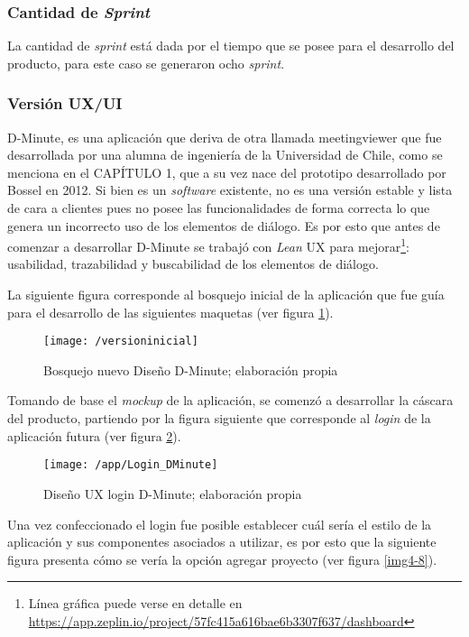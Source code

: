 \subsubsection{Cantidad de \textit{Sprint}}

La cantidad de \textit{sprint} está dada por el tiempo que se posee para el desarrollo del producto, para este caso se generaron ocho \textit{sprint}.

\subsubsection{Versión UX/UI}

D-Minute, es una aplicación que deriva de otra llamada meetingviewer que fue desarrollada por una alumna de ingeniería de la Universidad de Chile, como se menciona en el CAPÍTULO 1, que a su vez nace del prototipo desarrollado por Bossel en 2012. Si bien es un \textit{software} existente, no es una versión estable y lista de cara a clientes pues no posee las funcionalidades de forma correcta lo que genera un incorrecto uso de los elementos de diálogo. Es por esto que antes de comenzar a desarrollar D-Minute se trabajó con \textit{Lean} UX para mejorar\footnote{Línea gráfica puede verse en detalle en \url{https://app.zeplin.io/project/57fc415a616bae6b3307f637/dashboard}}: usabilidad, trazabilidad y buscabilidad de los elementos de diálogo.

La siguiente figura corresponde al bosquejo inicial de la aplicación que fue guía para el desarrollo de las siguientes maquetas (ver figura \ref{img4-6}).

\begin{figure}[!h]
\centering
\texttt{[image: /versioninicial]}
\caption{Bosquejo nuevo Diseño D-Minute; elaboración propia} 
\label{img4-6}
\end{figure}

Tomando de base el \textit{mockup} de la aplicación, se comenzó a desarrollar la cáscara del producto, partiendo por la figura siguiente que corresponde al \textit{login} de la aplicación futura (ver figura \ref{img4-7}).

\begin{figure}[!h]
\centering
\texttt{[image: /app/Login\_DMinute]}
\caption{Diseño UX login D-Minute; elaboración propia} 
\label{img4-7}
\end{figure}

Una vez confeccionado el login fue posible establecer cuál sería el estilo de la aplicación y sus componentes asociados a utilizar, es por esto que la siguiente figura presenta cómo se vería la opción agregar proyecto (ver figura \ref{img4-8}).


